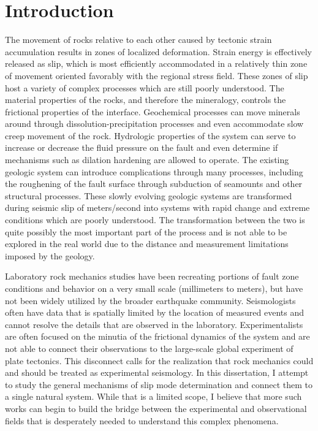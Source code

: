 \chapter*{Introduction}

The movement of rocks relative to each other caused by tectonic strain accumulation results in zones of localized deformation. Strain energy is effectively released as slip, which is most efficiently accommodated in a relatively thin zone of movement oriented favorably with the regional stress field. These zones of slip host a variety of complex processes which are still poorly understood. The material properties of the rocks, and therefore the mineralogy, controls the frictional properties of the interface. Geochemical processes can move minerals around through dissolution-precipitation processes and even accommodate slow creep movement of the rock. Hydrologic properties of the system can serve to increase or decrease the fluid pressure on the fault and even determine if mechanisms such as dilation hardening are allowed to operate. The existing geologic system can introduce complications through many processes, including the roughening of the fault surface through subduction of seamounts and other structural processes. These slowly evolving geologic systems are transformed during seismic slip of meters/second into systems with rapid change and extreme conditions which are poorly understood. The transformation between the two is quite possibly the most important part of the process and is not able to be explored in the real world due to the distance and measurement limitations imposed by the geology.

Laboratory rock mechanics studies have been recreating portions of fault zone conditions and behavior on a very small scale (millimeters to meters), but have not been widely utilized by the broader earthquake community. Seismologists often have data that is spatially limited by the location of measured events and cannot resolve the details that are observed in the laboratory. Experimentalists are often focused on the minutia of the frictional dynamics of the system and are not able to connect their observations to the large-scale global experiment of plate tectonics. This disconnect calls for the realization that rock mechanics could and should be treated as experimental seismology. In this dissertation, I attempt to study the general mechanisms of slip mode determination and connect them to a single natural system. While that is a limited scope, I believe that more such works can begin to build the bridge between the experimental and observational fields that is desperately needed to understand this complex phenomena.

